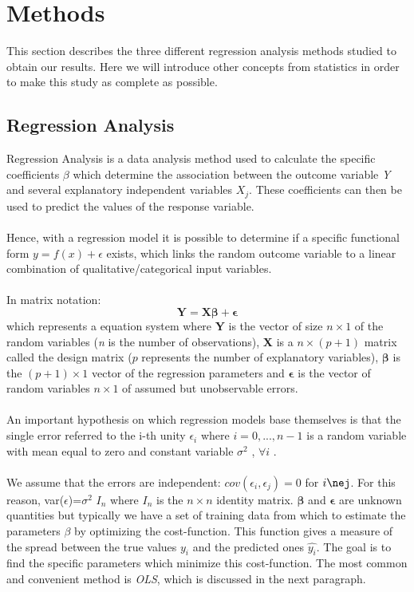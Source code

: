 \documentclass{emulateapj}
\begin{document}
\section{Methods}
\label{sec:theory_methods}
This section describes the three different regression analysis methods studied to obtain our results. Here we will introduce other concepts from statistics in order to make this study as complete as possible.

\subsection{Regression Analysis}
Regression Analysis is a data analysis method used to calculate the specific coefficients $\beta$ which determine the association between the outcome variable \textit{Y} and several explanatory independent variables \textit{$X_j$}. These coefficients can then be used to predict the values of the response variable. \\
\\
Hence, with a regression model it is possible to determine if a specific functional form $y=f(x)+\epsilon$ exists, which links the random outcome variable to a linear combination of qualitative/categorical input variables.
\\
\\In matrix notation:
\begin{equation}
    \mathbf{Y}=\mathbf{X}\boldsymbol{\beta}+\boldsymbol{\epsilon}
\end{equation}
which represents a equation system where \textbf{Y} is the vector of size $n\times1$ of the random variables (\textit{n} is the number of observations),
\textbf{X} is a $n\times(p+1)$ matrix called the design matrix ($p$ represents the number of explanatory variables),
$\boldsymbol{\beta}$ is the $(p+1)\times1$ vector of the regression parameters and $\boldsymbol{\epsilon}$ is the vector of random variables $n\times1$ of assumed but unobservable errors.\\
\\
An important hypothesis on which regression models base themselves is that the single error referred to the i-th unity $\epsilon_i$ where $i=0,...,n-1$ is a random variable with mean equal to zero and constant variable 
 $\sigma ^2$ , $\forall i$  
 .\\
 \\We assume that the errors are independent: $cov(\epsilon_i,\epsilon_j)=0$ 
 for $i\nej$. For this reason, 
 var(\textbf{$\epsilon$})=$\sigma^2$ 
 \textbf{$I_{n}$} where \textbf{$I_{n}$} is the $n\times n$ identity matrix. $\boldsymbol{\beta}$ and $\boldsymbol{\epsilon}$ are unknown quantities but typically we have a set of training data from which to estimate the parameters \textbf{$\beta$} by optimizing the cost-function. This function gives a measure of the spread between the true values $y_i$ and the predicted ones $\hat{y_i}$. The goal is to find the specific parameters which minimize this cost-function. The most common and convenient method is \textit{OLS}, which is discussed in the next paragraph.
\end{document}
